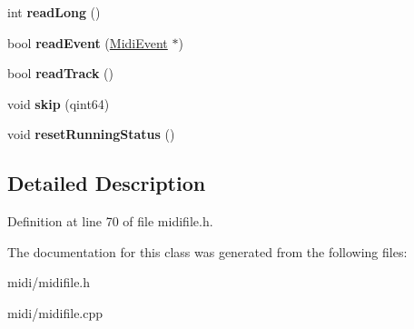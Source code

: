 \begin{DoxyCompactItemize}
\item 
\mbox{\label{class_ms_1_1_midi_file_aedd3144615cf104d0a05f82583b9a9de}} 
int {\bfseries read\+Long} ()
\item 
\mbox{\label{class_ms_1_1_midi_file_ab9b768146662abaf226240bd530c5f18}} 
bool {\bfseries read\+Event} (\hyperlink{class_ms_1_1_midi_event}{Midi\+Event} $\ast$)
\item 
\mbox{\label{class_ms_1_1_midi_file_a3a125b39fb645a5576a97f889cceba30}} 
bool {\bfseries read\+Track} ()
\item 
\mbox{\label{class_ms_1_1_midi_file_afe2f0f15effd198649ec822fa99888a6}} 
void {\bfseries skip} (qint64)
\item 
\mbox{\label{class_ms_1_1_midi_file_afce758349d5ab5fe853f8981c37e7142}} 
void {\bfseries reset\+Running\+Status} ()
\end{DoxyCompactItemize}


\subsection{Detailed Description}


Definition at line 70 of file midifile.\+h.



The documentation for this class was generated from the following files\+:\begin{DoxyCompactItemize}
\item 
midi/midifile.\+h\item 
midi/midifile.\+cpp\end{DoxyCompactItemize}
